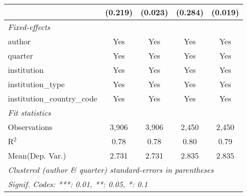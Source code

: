 \begin{tabular}{lcccc}
                                            & (0.219)      & (0.023) & (0.284) & (0.019)\\   
   \midrule
   \emph{Fixed-effects}\\
   author                                   & Yes          & Yes     & Yes     & Yes\\  
   quarter                                  & Yes          & Yes     & Yes     & Yes\\  
   institution                              & Yes          & Yes     & Yes     & Yes\\  
   institution\_type                        & Yes          & Yes     & Yes     & Yes\\  
   institution\_country\_code               & Yes          & Yes     & Yes     & Yes\\  
   \midrule
   \emph{Fit statistics}\\
   Observations                             & 3,906        & 3,906   & 2,450   & 2,450\\  
   R$^2$                                    & 0.78         & 0.78    & 0.80    & 0.79\\  
Mean(Dep. Var.) & 2.731 & 2.731 & 2.835 & 2.835 \\
   \midrule \midrule
   \multicolumn{5}{l}{\emph{Clustered (author \& quarter) standard-errors in parentheses}}\\
   \multicolumn{5}{l}{\emph{Signif. Codes: ***: 0.01, **: 0.05, *: 0.1}}\\
\end{tabular}
\par\endgroup
